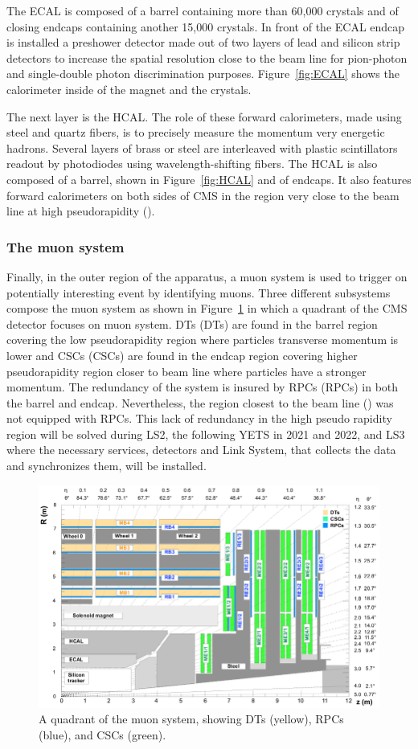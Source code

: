 	The ECAL is composed of a barrel containing more than 60,000 crystals and of closing endcaps containing another 15,000 crystals. In front of the ECAL endcap is installed a preshower detector made out of two layers of lead and silicon strip detectors to increase the spatial resolution close to the beam line for pion-photon and single-double photon discrimination purposes. Figure~\ref{fig:ECAL} shows the calorimeter inside of the magnet and the crystals.
	
	The next layer is the HCAL. The role of these forward calorimeters, made using steel and quartz fibers, is to precisely measure the momentum very energetic hadrons. Several layers of brass or steel are interleaved with plastic scintillators readout by photodiodes using wavelength-shifting fibers. The HCAL is also composed of a barrel, shown in Figure~\ref{fig:HCAL} and of endcaps. It also features forward calorimeters on both sides of CMS in the region very close to the beam line at high pseudorapidity ().
	
\endgroup
	
		\subsubsection{The muon system}
		\label{chapt2:sssec:muon}
	
	Finally, in the outer region of the apparatus, a muon system is used to trigger on potentially interesting event by identifying muons. Three different subsystems compose the muon system as shown in Figure~\ref{fig:Quadrant} in which a quadrant of the CMS detector focuses on muon system. \acl{DT}s (DTs) are found in the barrel region covering the low pseudorapidity region where particles transverse momentum is lower and \acl{CSC}s (CSCs) are found in the endcap region covering higher pseudorapidity region closer to beam line where particles have a stronger momentum. The redundancy of the system is insured by \acl{RPC}s (RPCs) in both the barrel and endcap. Nevertheless, the region closest to the beam line () was not equipped with RPCs. This lack of redundancy in the high pseudo rapidity region will be solved during LS2, the following \acf{YETS} in 2021 and 2022, and LS3 where the necessary services, detectors and Link System, that collects the data and synchronizes them, will be installed.

	\begin{figure}[H]
		\centering
		\includegraphics[width=0.9\linewidth]{fig/chapt2/Muon_quadrant.png}
		\caption{\label{fig:Quadrant} A quadrant of the muon system, showing DTs (yellow), RPCs (blue), and CSCs (green).}
	\end{figure}

\clearpage{\pagestyle{empty}\cleardoublepage}